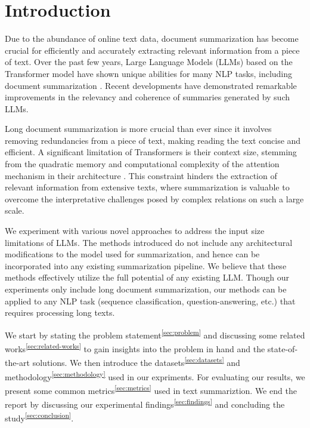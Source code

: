 \section{Introduction}
\label{sec:introduction}

Due to the abundance of online text data, document summarization has become crucial
for efficiently and accurately extracting relevant information from a piece of text.
Over the past few years, Large Language Models (LLMs) based on the Transformer model
\cite{vaswani2017attention} have shown unique abilities for many NLP tasks, including
document summarization \cite{yadav2023state}.
Recent developments have demonstrated remarkable improvements in the relevancy and
coherence of summaries generated by such LLMs.

Long document summarization is more crucial than ever since it involves removing redundancies
from a piece of text, making reading the text concise and efficient.
A significant limitation of Transformers is their context size, stemming from the quadratic
memory and computational complexity of the attention mechanism in their architecture
\cite{du2023improving}.
This constraint hinders the extraction of relevant information from extensive texts, where
summarization is valuable to overcome the interpretative challenges posed by complex
relations on such a large scale.

We experiment with various novel approaches to address the input size limitations of LLMs.
The methods introduced do not include any architectural modifications to the model used for
summarization, and hence can be incorporated into any existing summarization pipeline.
We believe that these methods effectively utilize the full potential of any existing LLM.
Though our experiments only include long document summarization, our methods can be applied
to any NLP task (sequence classification, question-answering, etc.) that requires processing
long texts.

We start by stating the problem statement\textsuperscript{\ref{sec:problem}} and discussing
some related works\textsuperscript{\ref{sec:related-works}} to gain insights into the problem
in hand and the state-of-the-art solutions.
We then introduce the datasets\textsuperscript{\ref{sec:datasets}} and
methodology\textsuperscript{\ref{sec:methodology}} used in our expriments.
For evaluating our results, we present some common metrics\textsuperscript{\ref{sec:metrics}}
used in text summariztion.
We end the report by discussing our experimental findings\textsuperscript{\ref{sec:findings}}
and concluding the study\textsuperscript{\ref{sec:conclusion}}.
